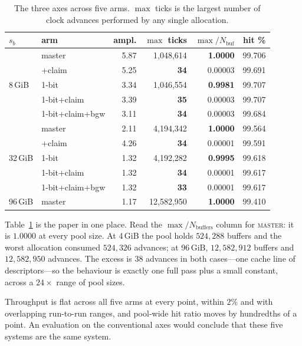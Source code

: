\documentclass[sigconf,nonacm]{acmart}
\begin{document}
\begin{table}[t]
\centering
\caption{The three axes across five arms. $\max$ ticks is the largest number of
clock advances performed by any single allocation.}
\label{tab:arms}
\small
\begin{tabular}{llrrrr}
\toprule
$s_b$ & arm & ampl. & $\max$ ticks & $\max/N_{\text{buf}}$ & hit \% \\
\midrule
\multirow{5}{*}{8\,GiB}
 & master         & 5.87 & 1{,}048{,}614 & \textbf{1.0000} & 99.706 \\
 & +claim         & 5.25 & \textbf{34}   & 0.00003 & 99.691 \\
 & 1-bit          & 3.34 & 1{,}046{,}554 & \textbf{0.9981} & 99.707 \\
 & 1-bit+claim    & 3.39 & \textbf{35}   & 0.00003 & 99.707 \\
 & 1-bit+claim+bgw& 3.11 & \textbf{34}   & 0.00003 & 99.684 \\
\midrule
\multirow{5}{*}{32\,GiB}
 & master         & 2.11 & 4{,}194{,}342 & \textbf{1.0000} & 99.564 \\
 & +claim         & 4.26 & \textbf{34}   & 0.00001 & 99.591 \\
 & 1-bit          & 1.32 & 4{,}192{,}282 & \textbf{0.9995} & 99.618 \\
 & 1-bit+claim    & 1.32 & \textbf{34}   & 0.00001 & 99.617 \\
 & 1-bit+claim+bgw& 1.32 & \textbf{33}   & 0.00001 & 99.617 \\
\midrule
96\,GiB & master  & 1.17 & 12{,}582{,}950 & \textbf{1.0000} & 99.410 \\
\bottomrule
\end{tabular}
\end{table}

Table~\ref{tab:arms} is the paper in one place. Read the
$\max/N_{\text{buffers}}$ column for \textsc{master}: it is $1.0000$ at every
pool size. At 4\,GiB the pool holds $524{,}288$ buffers and the worst
allocation consumed $524{,}326$ advances; at 96\,GiB, $12{,}582{,}912$ buffers
and $12{,}582{,}950$ advances. The excess is $38$ advances in both
cases---one cache line of descriptors---so the behaviour is exactly one full
pass plus a small constant, across a $24\times$ range of pool sizes.

Throughput is flat across all five arms at every point, within $2\%$ and with
overlapping run-to-run ranges, and pool-wide hit ratio moves by hundredths of a
point. An evaluation on the conventional axes would conclude that these five
systems are the same system.
\end{document}
